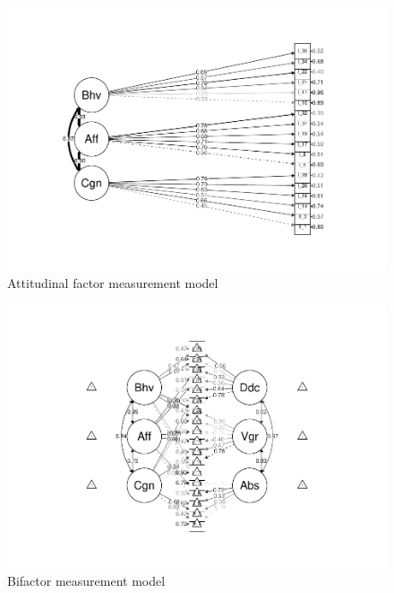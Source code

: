\documentclass[
  english,
  man]{apa7}
\begin{document}
\begin{figure}
\centering
\includegraphics{SIOPpapaja_files/figure-latex/CFAatt2-1.pdf}
\caption{\label{fig:CFAatt2}Attitudinal factor measurement model}
\end{figure}

\begin{figure}
\centering
\includegraphics{SIOPpapaja_files/figure-latex/CFAatt3-1.pdf}
\caption{\label{fig:CFAatt3}Bifactor measurement model}
\end{figure}
\end{document}
